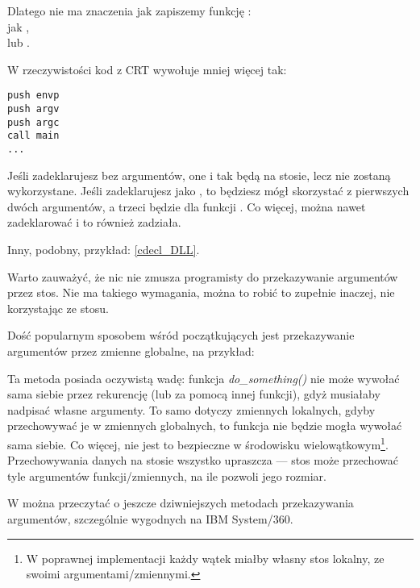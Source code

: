 \label{main_arguments}
\par
Dlatego nie ma znaczenia jak zapiszemy funkcję \main{}:\\
jak \main{}, \\
lub .

W rzeczywistości kod z \ac{CRT} wywołuje \main mniej więcej tak:
	
\begin{lstlisting}[style=customasmx86]
push envp
push argv
push argc
call main
...
\end{lstlisting}

Jeśli zadeklarujesz \main bez argumentów, one i tak będą na stosie, lecz nie zostaną wykorzystane.
Jeśli zadeklarujesz \main jako ,
to będziesz mógł skorzystać z pierwszych dwóch argumentów, a trzeci będzie dla funkcji .
Co więcej, można nawet zadeklarować  i to również zadziała.

Inny, podobny, przykład: \ref{cdecl_DLL}.


Warto zauważyć, że nic nie zmusza programisty do przekazywanie argumentów przez stos. Nie ma takiego wymagania, można to robić to zupełnie inaczej, nie korzystając ze stosu.

Dość popularnym sposobem wśród początkujących jest przekazywanie argumentów przez zmienne globalne, na przykład:



Ta metoda posiada oczywistą wadę: funkcja \emph{do\_something()} nie może wywołać sama siebie przez rekurencję (lub za pomocą innej funkcji), gdyż musiałaby nadpisać własne argumenty.
To samo dotyczy zmiennych lokalnych, gdyby przechowywać je w zmiennych globalnych, to funkcja nie będzie mogła wywołać sama siebie.
Co więcej, nie jest to bezpieczne w środowisku wielowątkowym\footnote{W poprawnej implementacji
każdy wątek miałby własny stos lokalny, ze swoimi argumentami/zmiennymi.}.
Przechowywania danych na stosie wszystko upraszcza ---
stos może przechować tyle argumentów funkcji/zmiennych,
na ile pozwoli jego rozmiar.

W  można przeczytać o jeszcze dziwniejszych metodach przekazywania argumentów, szczególnie wygodnych na IBM System/360.

